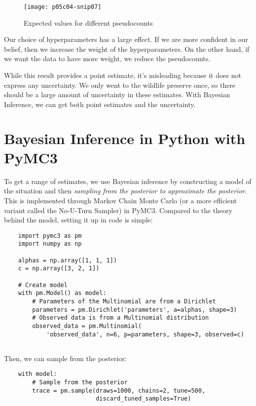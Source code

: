 \begin{figure*}[h]
    \texttt{[image: p05c04-snip07]}
    \caption{Expected values for different pseudocounts}
\end{figure*}

Our choice of hyperparameters has a large effect. If we are more confident in our belief, then we increase the weight of the hyperparameters. On the other hand, if we want the data to have more weight, we reduce the pseudocounts.

While this result provides a point estimate, it's misleading because it does not express any uncertainty. We only went to the wildlife preserve once, so there should be a large amount of uncertainty in these estimates. With Bayesian Inference, we can get both point estimates and the uncertainty.

\section{Bayesian Inference in Python with PyMC3}

To get a range of estimates, we use Bayesian inference by constructing a model of the situation and then \textit{sampling from the posterior to approximate the posterior}. This is implemented through Markov Chain Monte Carlo (or a more efficient variant called the No-U-Turn Sampler) \cite{Hoffman:2014:NSA:2627435.2638586} in PyMC3. Compared to the theory behind the model, setting it up in code is simple:


\begin{lstlisting}
    import pymc3 as pm
    import numpy as np
    
    alphas = np.array([1, 1, 1])
    c = np.array([3, 2, 1])
    
    # Create model
    with pm.Model() as model:
        # Parameters of the Multinomial are from a Dirichlet
        parameters = pm.Dirichlet('parameters', a=alphas, shape=3)
        # Observed data is from a Multinomial distribution
        observed_data = pm.Multinomial(
            'observed_data', n=6, p=parameters, shape=3, observed=c)   
    
\end{lstlisting}

Then, we can sample from the posterior:

\begin{lstlisting}
    with model:
        # Sample from the posterior
        trace = pm.sample(draws=1000, chains=2, tune=500, 
                          discard_tuned_samples=True)
\end{lstlisting}

